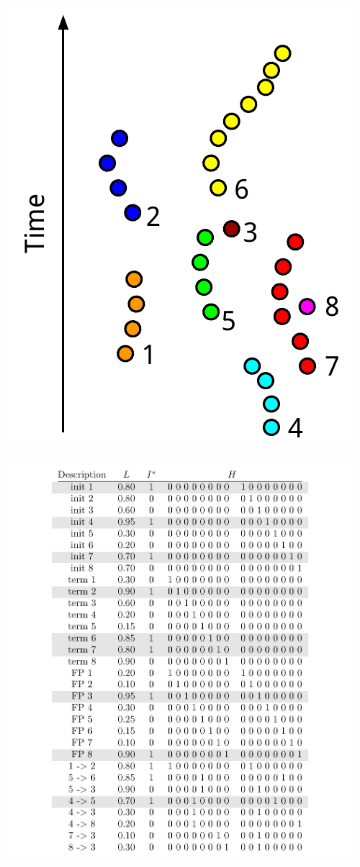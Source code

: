  		\begin{figure} 
 			\begin{subfigure}{.4\textwidth}
 			\includegraphics[width=\textwidth]{images/fig_tracking_linprog_tracklets}
 			\end{subfigure}%
 			\hfill
 			\begin{subfigure}{.6\textwidth}
 			\includegraphics[width=\textwidth]{fig_tracking_linprog_tablefull}

\end{subfigure}
\end{figure}
